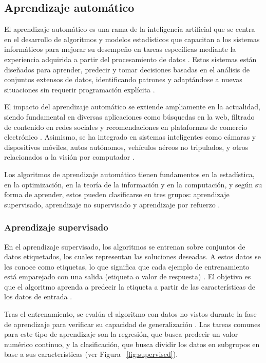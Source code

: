 \subsection{Aprendizaje automático}

El aprendizaje automático es una rama de la inteligencia artificial que se centra en el desarrollo de algoritmos y modelos estadísticos que capacitan a los sistemas informáticos para mejorar su desempeño en tareas específicas mediante la experiencia adquirida a partir del procesamiento de datos \cite{elgendy2020deep}. Estos sistemas están diseñados para aprender, predecir y tomar decisiones basadas en el análisis de conjuntos extensos de datos, identificando patrones y adaptándose a nuevas situaciones sin requerir programación explícita \cite{goodfellow2016deep}.

El impacto del aprendizaje automático se extiende ampliamente en la actualidad, siendo fundamental en diversas aplicaciones como búsquedas en la web, filtrado de contenido en redes sociales y recomendaciones en plataformas de comercio electrónico \cite{geron2019hands}. Asimismo, se ha integrado en sistemas inteligentes como cámaras y dispositivos móviles, autos autónomos, vehículos aéreos no tripulados, y otros relacionados a la visión por computador \cite{patterson2017deep}.

Los algoritmos de aprendizaje automático tienen fundamentos en la estadística, en la optimización, en la teoría de la información y en la computación, y según su forma de aprender, estos pueden clasificarse en tres grupos: aprendizaje supervisado, aprendizaje no supervisado y aprendizaje por refuerzo \cite{goodfellow2016deep}.

\subsubsection{Aprendizaje supervisado}

En el aprendizaje supervisado, los algoritmos se entrenan sobre conjuntos de datos etiquetados, los cuales representan las soluciones deseadas. A estos datos se les conoce como etiquetas, lo que significa que cada ejemplo de entrenamiento está emparejado con una salida (etiqueta o valor de respuesta) \cite{geron2019hands}. El objetivo es que el algoritmo aprenda a predecir la etiqueta a partir de las características de los datos de entrada \cite{patterson2017deep}.

Tras el entrenamiento, se evalúa el algoritmo con datos no vistos durante la fase de aprendizaje para verificar su capacidad de generalización \cite{geron2019hands}. Las tareas comunes para este tipo de aprendizaje son la regresión, que busca predecir un valor numérico continuo, y la clasificación, que busca dividir los datos en subgrupos en base a sus características (ver Figura ~\ref{fig:supervised}).

